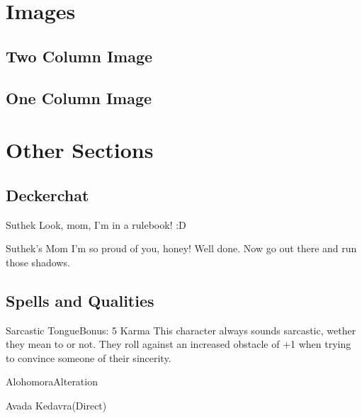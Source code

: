 \documentclass{ShadowTeXSR5}
\begin{document}
\chapter{Images}
\lipsum
\section{Two Column Image}
\lipsum
{}
\lipsum
\lipsum\par
\lipsum\par
\lipsum\par
\lipsum\par
\section{One Column Image}
\lipsum\par
\lipsum\par
\lipsum
\chapter{Other Sections}
\lipsum
\section{Deckerchat}
\lipsum[1-5]
\begin{deckercomment}{Suthek}
Look, mom, I'm in a rulebook! :D
\end{deckercomment}
\begin{deckercomment}{Suthek's Mom}
I'm so proud of you, honey! Well done. Now go out there and run those shadows.
\end{deckercomment}
\section{Spells and Qualities}
\lipsum[1]
\begin{spell}{Sarcastic Tongue}{Bonus: 5 Karma}
This character always sounds sarcastic, wether they mean to or not. They roll against an increased obstacle of +1 when trying to convince someone of their sincerity.
\end{spell}
\begin{spell}{Alohomora}{Alteration}
\lipsum[2]
\end{spell}
\begin{spell}{Avada Kedavra}{(Direct)}
\lipsum[3]
\end{spell}
\end{document}
